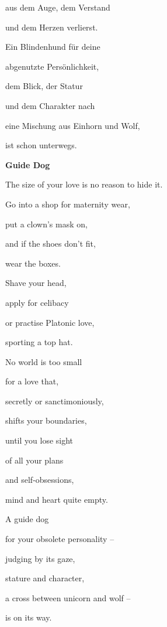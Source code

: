 \documentclass[a4paper]{article}
\begin{document}
aus dem Auge, dem Verstand

und dem Herzen verlierst.


\bigskip

Ein Blindenhund für deine

abgenutzte Persönlichkeit,

dem Blick, der Statur

und dem Charakter nach


\bigskip

eine Mischung aus Einhorn und Wolf,

ist schon unterwegs.

{\bfseries
Guide Dog}


\bigskip

The size of your love is no reason to hide it.


\bigskip

Go into a shop for maternity wear,

put a clown’s mask on, 

and if the shoes don’t fit,

wear the boxes.


\bigskip

Shave your head,

apply for celibacy

or practise Platonic love,

sporting a top hat.


\bigskip

No world is too small

for a love that,

secretly or sanctimoniously,

shifts your boundaries,


\bigskip

until you lose sight

of all your plans 

and self-obsessions,

mind and heart quite empty.


\bigskip

A guide dog 

for your obsolete personality – 

judging by its gaze,

stature and character, 


\bigskip

a cross between unicorn and wolf –

is on its way.


\bigskip
\end{document}
